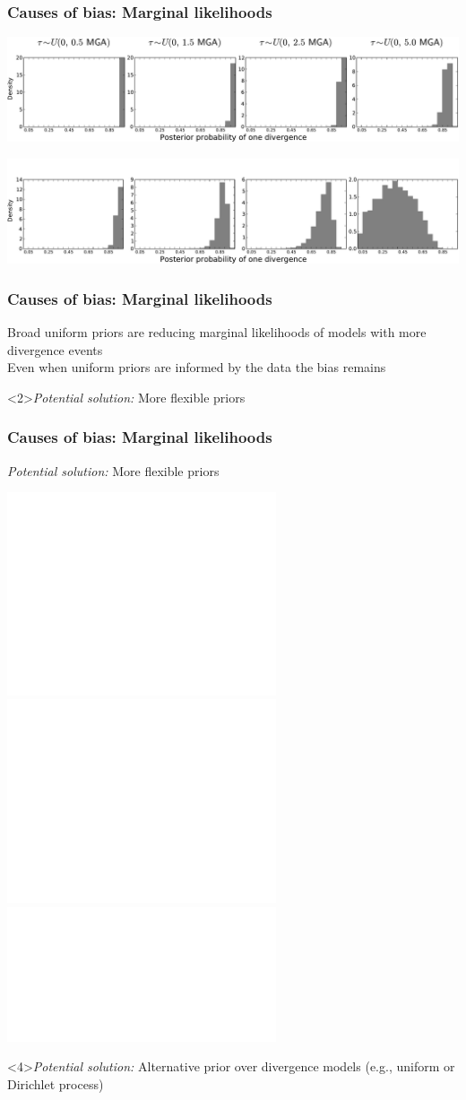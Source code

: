 \begin{frame}[t]
    \frametitle{Causes of bias: Marginal likelihoods}
    \vspace{1cm}
        \centerline{
        \includegraphics[width=\textwidth]{images/old-sims_power_psi_prob.pdf}}
        \vspace{0mm}
        \centerline{
        \includegraphics[width=\textwidth]{images/old-sims-inform10_power_psi_prob_headless.pdf}}
\end{frame}

\begin{frame}
    \frametitle{Causes of bias: Marginal likelihoods}
    Broad uniform priors are reducing marginal likelihoods of models with more
    divergence events\\
    \bigskip
    Even when uniform priors are informed by the data the bias remains\\
    \bigskip
    \begin{block}<2>{\it Potential solution:}
        More flexible priors
    \end{block}
\end{frame}

\begin{frame}[t]
    \frametitle{Causes of bias: Marginal likelihoods}
    \begin{block}{\it Potential solution:}
        More flexible priors
    \end{block}
    \smallskip
    \centerline{
        \includegraphics<1>[height=6.0cm]{images/marginal-plot-2d-uniform-prior.pdf}
        \includegraphics<2>[height=6.0cm]{images/marginal-plot-2d.pdf}
        \includegraphics<3>[width=\textwidth]{images/partition_numbers.pdf}}
    \begin{block}<4>{\it Potential solution:}
        Alternative prior over divergence models
        (e.g., uniform or Dirichlet process)
    \end{block}
\end{frame}

